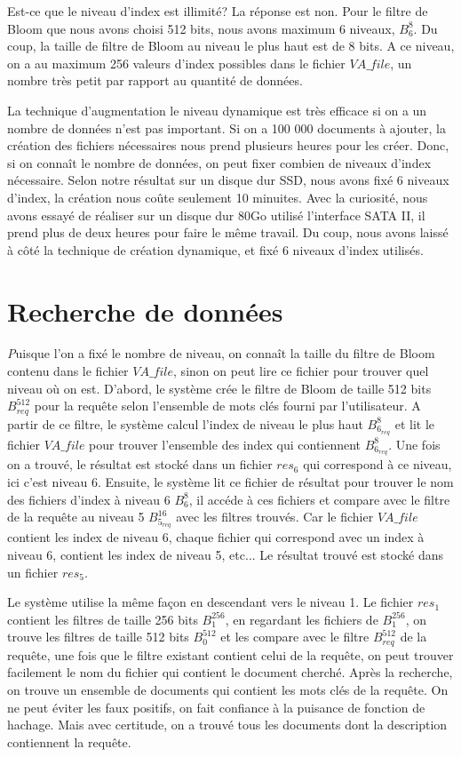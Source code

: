 	Est-ce que le niveau d'index est illimité? La réponse est non. Pour le filtre de Bloom que nous avons choisi 512 bits, nous avons maximum 6 niveaux, $B^{8}_6$. Du coup, la taille de filtre de Bloom au niveau le plus haut est de 8 bits. A ce niveau, on a au maximum 256 valeurs d'index possibles dans le fichier $VA\_file$, un nombre très petit par rapport au quantité de données. 
	
	La technique d'augmentation le niveau dynamique est très efficace si on a un nombre de données n'est pas important. Si on a 100 000 documents à ajouter, la création des fichiers nécessaires nous prend plusieurs heures pour les créer. Donc, si on connaît le nombre de données, on peut fixer combien de niveaux d'index nécessaire. Selon notre résultat sur un disque dur SSD, nous avons fixé 6 niveaux d'index, la création nous coûte seulement 10 minuites. Avec la curiosité, nous avons essayé de réaliser sur un disque dur 80Go utilisé l'interface SATA II, il prend plus de deux heures pour faire le même travail. Du coup, nous avons laissé à côté la technique de création dynamique, et fixé 6 niveaux d'index utilisés.	
	
\section{Recherche de données}
	{\huge \itshape P}uisque l'on a fixé le nombre de niveau, on connaît la taille du filtre de Bloom contenu dans le fichier $VA\_file$, sinon on peut lire ce fichier pour trouver quel niveau où on est. D'abord, le système crée le filtre de Bloom de taille 512 bits $B^{512}_{req}$ pour la requête selon l'ensemble de mots clés fourni par l'utilisateur. A partir de ce filtre, le système calcul l'index de niveau le plus haut $B^{8}_{6_{req}}$ et lit le fichier $VA\_file$ pour trouver l'ensemble des index qui contiennent $B^{8}_{6_{req}}$. Une fois on a trouvé, le résultat est stocké dans un fichier $res_6$ qui correspond à ce niveau, ici c'est niveau 6. Ensuite, le système lit ce fichier de résultat pour trouver le nom des fichiers d'index à niveau 6 $B^{8}_{6}$, il accéde à ces fichiers et compare avec le filtre de la requête au niveau 5 $B^{16}_{5_{req}}$ avec les filtres trouvés. Car le fichier $VA\_file$ contient les index de niveau 6, chaque fichier qui correspond avec un index à niveau 6, contient les index de niveau 5, etc... Le résultat trouvé est stocké dans un fichier $res_5$. 
	
	Le système utilise la même façon en descendant vers le niveau 1. Le fichier $res_1$ contient les filtres de taille 256 bits $B^{256}_{1}$, en regardant les fichiers de $B^{256}_{1}$, on trouve les filtres de taille 512 bits $B^{512}_{0}$ et les compare avec le filtre $B^{512}_{req}$ de la requête, une fois que le filtre existant contient celui de la requête, on peut trouver facilement le nom du fichier qui contient le document cherché. Après la recherche, on trouve un ensemble de documents qui contient les mots clés de la requête. On ne peut éviter les faux positifs, on fait confiance à la puisance de fonction de hachage. Mais avec certitude, on a trouvé tous les documents dont la description contiennent la requête.

